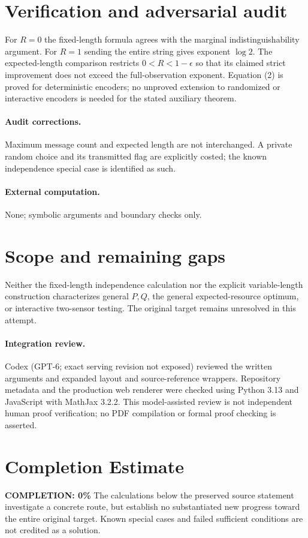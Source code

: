 \documentclass[11pt]{article}
\begin{document}
\section{Verification and adversarial audit}
For $R=0$ the fixed-length formula agrees with the marginal indistinguishability argument. For $R=1$ sending the entire string gives exponent $\log2$. The expected-length comparison restricts $0<R<1-\epsilon$ so that its claimed strict improvement does not exceed the full-observation exponent. Equation (2) is proved for deterministic encoders; no unproved extension to randomized or interactive encoders is needed for the stated auxiliary theorem.
\paragraph{Audit corrections.} Maximum message count and expected length are not interchanged. A private random choice and its transmitted flag are explicitly costed; the known independence special case is identified as such.
\paragraph{External computation.} None; symbolic arguments and boundary checks only.
\section{Scope and remaining gaps}
Neither the fixed-length independence calculation nor the explicit variable-length construction characterizes general $P,Q$, the general expected-resource optimum, or interactive two-sensor testing. The original target remains unresolved in this attempt.
\paragraph{Integration review.} Codex (GPT-6; exact serving revision not exposed) reviewed the written arguments and expanded layout and source-reference wrappers. Repository metadata and the production web renderer were checked using Python 3.13 and JavaScript with MathJax 3.2.2. This model-assisted review is not independent human proof verification; no PDF compilation or formal proof checking is asserted.

\section{Completion Estimate}
\noindent\textbf{COMPLETION: 0\%}
The calculations below the preserved source statement investigate a concrete route,
but establish no substantiated new progress toward the entire original target.
Known special cases and failed sufficient conditions are not credited as a solution.
\end{document}

